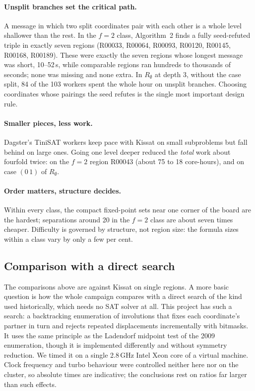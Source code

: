 \documentclass[11pt,a4paper,oneside]{report}
\theoremstyle{definition}
\begin{document}
\paragraph{Unsplit branches set the critical path.} A message in which two split coordinates
pair with each other is a whole level shallower than the rest. In the $f=2$ class, Algorithm~2
finds a fully seed-refuted triple in exactly seven regions (R00033, R00064, R00093, R00120,
R00145, R00168, R00189). These were exactly the seven regions whose longest message was short,
10--52\,s, while comparable regions ran hundreds to thousands of seconds; none was missing and
none extra. In $R_\emptyset$ at depth 3, without the case split, 84 of the 103 workers spent
the whole hour on unsplit branches. Choosing coordinates whose pairings the seed refutes is
the single most important design rule.

\paragraph{Smaller pieces, less work.} Dagster's TiniSAT workers keep pace with Kissat on
small subproblems but fall behind on large ones. Going one level deeper reduced the
\emph{total} work about fourfold twice: on the $f=2$ region R00043 (about 75 to 18
core-hours), and on case $(0\,1)$ of $R_\emptyset$.

\paragraph{Order matters, structure decides.} Within every class, the compact fixed-point
sets near one corner of the board are the hardest; separations around 20 in the $f=2$ class
are about seven times cheaper. Difficulty is governed by structure, not region size: the
formula sizes within a class vary by only a few per cent.

\subsection{Comparison with a direct search}\label{p8-sec:direct}

The comparisons above are against Kissat on single regions. A more basic question is how the whole
campaign compares with a direct search of the kind used historically, which needs no SAT solver at
all. This project has such a search: a backtracking enumeration of involutions that fixes each
coordinate's partner in turn and rejects repeated displacements incrementally with bitmasks. It
uses the same principle as the Ladendorf midpoint test of the 2009 enumeration, though it is
implemented differently and without symmetry reduction. We timed it on a single 2.8\,GHz Intel Xeon core of a virtual machine. Clock frequency and turbo
behaviour were controlled neither here nor on the cluster, so absolute times are indicative; the
conclusions rest on ratios far larger than such effects.
\end{document}
